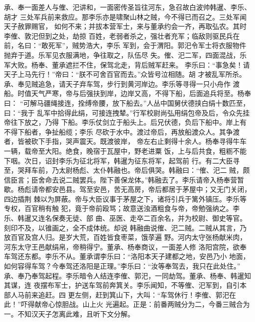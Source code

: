 承、奉一面差人与傕、汜讲和，一面密传圣旨往河东，急召故白波帅韩暹、李乐、胡才
三处军兵前来救应。那李乐亦是啸聚山林之贼，今不得已而召之。三处军闻天子赦罪赐官，
如何不来；并拔本营军士，来与董承约会一齐，再取弘农。其时李傕、敦汜但到之处，劫掠
百姓，老弱者杀之，强壮者充军；临敌则驱民兵在前，名曰：“敢死军”，贼势浩大，李乐
军到，会于渭阳。郭汜令军士将衣服物件抛弃于道。乐军见衣服满地，争往取之，队伍尽
失。傕、汜二军，四面混战，乐军大败。杨奉、董承遮拦不住，保驾北走，背后贼军赶来。
李乐曰：“事急矣！请天子上马先行！”帝曰：“朕不可舍百官而去。”众皆号泣相随。胡
才被乱军所杀。承、奉见贼追急，请天子弃车驾，步行到黄河岸边。李乐等寻得一只小舟作
渡船。时值天气严寒，帝与后强扶到岸，边岸又高，不得下船，后面追兵将至。杨奉曰：
“可解马疆绳接连，拴缚帝腰，放下船去。”人丛中国舅伏德挟白绢十数匹至，曰：“我于
乱军中拾得此绢，可接连拽辇。”行军校尉尚弘用绢包帝及后，令众先挂帝往下放之，乃得
下船。李乐仗剑立于船头上。后兄伏德，负后下船中。岸上有不得下船者，争扯船缆；李乐
尽砍于水中。渡过帝后，再放船渡众人。其争渡者，皆被砍下手指，哭声震天。既渡彼岸，
帝左右止剩得十余人。杨奉寻得牛车一辆，载帝至大阳。绝食，晚宿于瓦屋中，野老进粟
饭，上与后共食，粗粝不能下咽。次日，诏封李乐为征北将军，韩暹为征东将军，起驾前
行。有二大臣寻至，哭拜车前，乃太尉杨彪、太仆韩融也。帝后俱哭。韩融曰：“傕、汜二
贼，颇信臣言；臣舍命去说二贼罢兵。陛下善保龙体。”韩融去了。李乐请帝入杨奉营暂
歇。杨彪请帝都安邑县。驾至安邑，苦无高房，帝后都居于茅屋中；又无门关闭，四边插荆
棘以为屏蔽。帝与大臣议事于茅屋之下，诸将引兵于篱外镇压。李乐等专权，百官稍有触
犯，竟于帝前殴骂；故意送浊酒粗食与帝，帝勉强纳之。李乐、韩暹又连名保奏无徒、部
曲、巫医、走卒二百余名，并为校尉、御史等官。刻印不及，以锥画之，全不成体统。却说
韩融曲说傕、汜二贼。二贼从其言，乃放百官及宫人归。是岁大荒，百姓皆食枣菜，饿莩遍
野。河内太守张杨献米肉，河东太守王邑献绢帛，帝稍得宁。董承、杨奉商议，一面差人修
洛阳宫院，欲奉车驾还东都。李乐不从。董承谓李乐曰：“洛阳本天子建都之地，安邑乃小
地面，如何容得车驾？今奉驾还洛阳是正理。”李乐曰：“汝等奉驾去，我只在此处住。”
承、奉乃奉驾起程。李乐暗令人结连李傕、郭汜，一同劫驾。董承、杨奉、韩暹知其谋，连
夜摆布军士，护送车驾前奔箕关。李乐闻知，不等傕、汜军到，自引本部人马前来追赶。四
更左侧，赶到箕山下，大叫：“车驾休行！李傕、郭汜在此！”吓得献帝心惊胆战。山上火
光遍起。正是：前番两贼分为二，今番三贼合为一。不知汉天子怎离此难，且听下文分解。